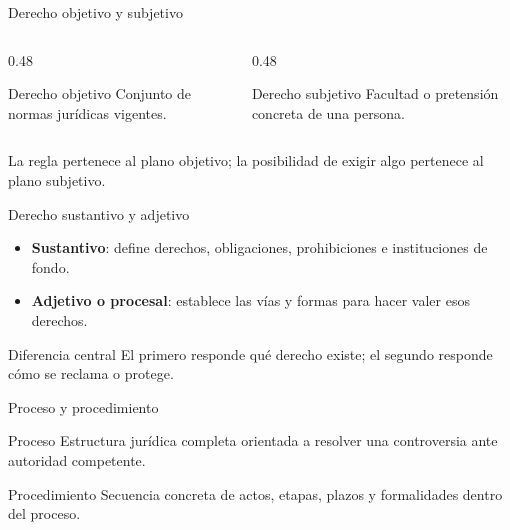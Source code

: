 \documentclass[
  spanish,
  aspectratio=169,
  xcolor={dvipsnames,table}
]{beamer}
\begin{document}
\begin{frame}{Derecho objetivo y subjetivo}
  \begin{columns}[T]
    \begin{column}{0.48\linewidth}
      \begin{block}{Derecho objetivo}
        Conjunto de normas jurídicas vigentes.
      \end{block}
    \end{column}
    \begin{column}{0.48\linewidth}
      \begin{block}{Derecho subjetivo}
        Facultad o pretensión concreta de una persona.
      \end{block}
    \end{column}
  \end{columns}
  \vspace{0.25cm}
  La regla pertenece al plano objetivo; la posibilidad de exigir algo pertenece al plano subjetivo.
\end{frame}

\begin{frame}{Derecho sustantivo y adjetivo}
  \begin{itemize}
    \item \textbf{Sustantivo}: define derechos, obligaciones, prohibiciones e instituciones de fondo.
    \item \textbf{Adjetivo o procesal}: establece las vías y formas para hacer valer esos derechos.
  \end{itemize}
  \begin{block}{Diferencia central}
    El primero responde qué derecho existe; el segundo responde cómo se reclama o protege.
  \end{block}
\end{frame}

\begin{frame}{Proceso y procedimiento}
  \begin{block}{Proceso}
    Estructura jurídica completa orientada a resolver una controversia ante autoridad competente.
  \end{block}
  \begin{block}{Procedimiento}
    Secuencia concreta de actos, etapas, plazos y formalidades dentro del proceso.
  \end{block}
\end{frame}
\end{document}
